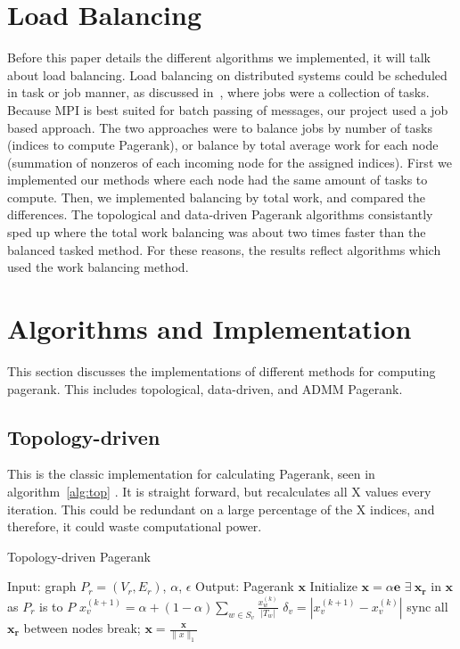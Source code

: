 \documentclass[letterpaper,11pt,onecolumn]{article}
\begin{document}
\section{Load Balancing}
Before this paper details the different algorithms we implemented, it will talk about load balancing. Load balancing on distributed systems could be scheduled in task or job manner, as discussed in~\cite{distributed}, where jobs were a collection of tasks. Because MPI is best suited for batch passing of messages, our project used a job based approach. The two approaches were to balance jobs by number of tasks (indices to compute Pagerank), or balance by total average work for each node (summation of nonzeros of each incoming node for the assigned indices). First we implemented our methods where each node had the same amount of tasks to compute. Then, we implemented balancing by total work, and compared the differences. The topological and data-driven Pagerank algorithms consistantly sped up where the total work balancing was about two times faster than the balanced tasked method. For these reasons, the results reflect algorithms which used the work balancing method. 

\section{Algorithms and Implementation}

This section discusses the implementations of different methods for computing pagerank. This includes topological, data-driven, and ADMM Pagerank. 

\subsection{Topology-driven}
This is the classic implementation for calculating Pagerank, seen in algorithm~\ref{alg:top} . It is straight forward, but recalculates all X values every iteration. This could be redundant on a large percentage of the X indices, and therefore, it could waste computational power. 

\begin{algorithm}
\caption{Topology-driven Pagerank}
\label{alg:top}
\begin{algorithmic}[1]
  \STATE Input: graph $P_{r} = (V_r, E_r)$, $\alpha$, $\epsilon$
  \STATE Output: Pagerank $\mathbf{x}$
  \STATE Initialize $\mathbf{x} = \alpha \mathbf{e}$
  \STATE $\exists  \medspace \mathbf{x_r}$ in $\mathbf{x}$ as $P_r$ is to $P$
		\STATE $x_{v}^{(k+1)} = \alpha + (1 - \alpha) \sum_{w \in S_v} \frac{x_{w}^{(k)}}{|T_w|} $
		\STATE $\delta_{v} = | x_{v}^{(k+1)} - x_{v}^{(k)} | $
	\ENDFOR
	\STATE sync all $\mathbf{x_r}$ between nodes
	\IF{$\|\delta \|_{\infty} < \epsilon$}
		\STATE break;
	\ENDIF
  \ENDWHILE
  \STATE $\mathbf{x} = \frac{\mathbf{x} }{\|x\|_{1}}$
\end{algorithmic}
\end{algorithm}
\end{document}
